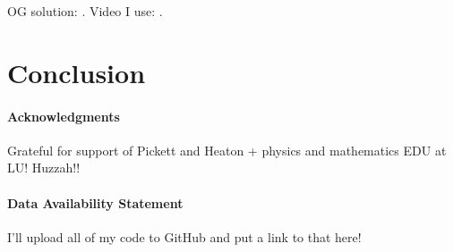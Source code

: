 \documentclass{CUP-JNL-DTM}%
\theoremstyle{definition}
\numberwithin{equation}{section}
\begin{document}
OG solution: \cite{schwarzschildGravitationalFieldMass1999}. Video I use: \cite{eigenchrisRelativity108aSchwarzschild}. 

\section{Conclusion}


\begin{Backmatter}

\paragraph{Acknowledgments}

Grateful for support of Pickett and Heaton + physics and mathematics EDU at LU! Huzzah!!

\paragraph{Data Availability Statement}
I'll upload all of my code to GitHub and put a link to that here!




\end{Backmatter}
\end{document}
